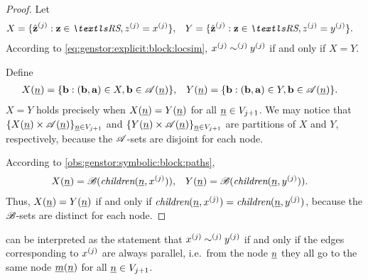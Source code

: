 \begin{proof}
  Let
  \begin{align}
    X &= \{ \loc{\hat{\vec{z}}}{j} : \vec{z} \in \RS, \loc{z}{j} =
        \loc{x}{j} \},
    & Y &= \{ \loc{\hat{\vec{z}}}{j} : \vec{z} \in \RS, \loc{z}{j} =
        \loc{y}{j} \}.
  \end{align}
  According to \vref{eq:genstor:explicit:block:locsim}, $x^{(j)}
  \mathbin{\sim^{(j)}} y^{(j)}$ if and only if $X = Y$.

  Define
  \begin{align}
    X(\underline{n}) &= \{ \bm{\mathrm{b}} : (\bm{\mathrm{b}}, \bm{\mathrm{a}}) \in X, \bm{\mathrm{b}} \in
    \mathscr{A}(\underline{n}) \},
    & Y(\underline{n}) &= \{ \bm{\mathrm{b}} : (\bm{\mathrm{b}}, \bm{\mathrm{a}}) \in Y, \bm{\mathrm{b}} \in
    \mathscr{A}(\underline{n}) \} \text.
  \end{align}
  $X = Y$ holds precisely when
  $X(\underline{n}) = Y(\underline{n})$ for all $\underline{n} \in V_{j + 1}$.
  We may notice that $\{X(\underline{n}) \times
  \mathscr{A}(\underline{n})\}_{\underline{n} \in V_{j + 1}}$ and
  $\{Y(\underline{n}) \times
  \mathscr{A}(\underline{n})\}_{\underline{n} \in V_{j + 1}}$ are partitions of $X$
  and $Y$, respectively, because the $\mathscr{A}$-sets are disjoint for
  each node.

  According to \cref{obs:genstor:symbolic:block:paths},
  \begin{align}
    X(\underline{n}) &= \mathscr{B}(\textit{children}(\underline{n}, x^{(j)})),
    & Y(\underline{n}) &= \mathscr{B}(\textit{children}(\underline{n}, y^{(j)}))
                      \text.
  \end{align}
  Thus, $X(\underline{n}) = Y(\underline{n})$ if and only if
  $\textit{children}(\underline{n}, x^{(j)}) = \textit{children}(\underline{n},
  y^{(j)})$,
  because the $\mathscr{B}$-sets are distinct for each node.
\end{proof}

 can be interpreted as the
statement that $x^{(j)} \mathbin{\sim^{(j)}} y^{(j)}$ if and
only if the  edges corresponding to $x^{(j)}$ are
always parallel, i.e.~from the node $\underline{n}$ they all go to the
same node $\underline{m}(\underline{n})$ for all $\underline{n} \in V_{j + 1}$.

